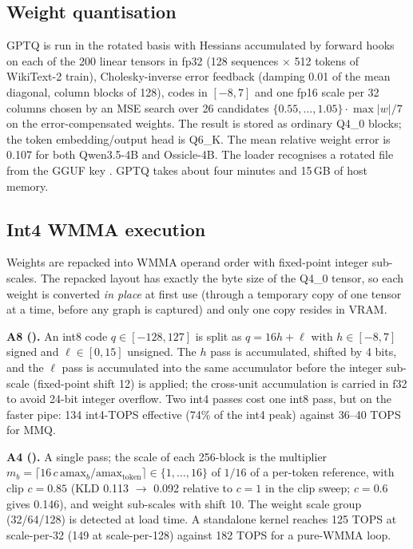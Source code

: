 \documentclass[10.5pt,a4paper]{article}
\newcommand{\tx}[1]{\texttt{\detokenize{#1}}}
\begin{document}
\subsection{Weight quantisation}
GPTQ is run in the rotated basis with Hessians accumulated by forward hooks on each of the 200 linear tensors in fp32 (128 sequences $\times$ 512 tokens of WikiText-2 train), Cholesky-inverse
error feedback (damping 0.01 of the mean diagonal, column blocks of 128), codes in $[-8,7]$ and one fp16 scale per 32 columns chosen by an MSE search over 26 candidates
$\{0.55,\ldots,1.05\}\cdot\max|w|/7$ on the error-compensated weights. The result is stored as ordinary Q4\_0 blocks; the token embedding/output head is Q6\_K. The mean relative weight error is
0.107 for both Qwen3.5-4B and Ossicle-4B. The loader recognises a rotated file from the GGUF key \tx{ossicle.int4_rotation_block}. GPTQ takes about four minutes and 15\,GB of host memory.

\subsection{Int4 WMMA execution}
Weights are repacked into WMMA operand order with fixed-point integer sub-scales. The repacked layout has exactly the byte size of the Q4\_0 tensor, so each weight is converted \emph{in place}
at first use (through a temporary copy of one tensor at a time, before any graph is captured) and only one copy resides in VRAM.

\textbf{A8 (\tx{quality}).} An int8 code $q\in[-128,127]$ is split as $q=16h+\ell$ with $h\in[-8,7]$ signed and $\ell\in[0,15]$ unsigned. The $h$ pass is accumulated, shifted by 4 bits, and the
$\ell$ pass is accumulated into the same accumulator before the integer sub-scale (fixed-point shift 12) is applied; the cross-unit accumulation is carried in f32 to avoid 24-bit integer overflow.
Two int4 passes cost one int8 pass, but on the faster pipe: 134 int4-TOPS effective (74\% of the int4 peak) against 36--40 TOPS for MMQ.

\textbf{A4 (\tx{fast}).} A single pass; the scale of each 256-block is the multiplier $m_b=\lceil16\,c\,\mathrm{amax}_b/\mathrm{amax}_{\text{token}}\rceil\in\{1,\ldots,16\}$ of $1/16$ of a per-token
reference, with clip $c=0.85$ (KLD 0.113 $\to$ 0.092 relative to $c=1$ in the clip sweep; $c=0.6$ gives 0.146), and weight sub-scales with shift 10. The weight scale group (32/64/128) is detected at load time.
A standalone kernel reaches 125 TOPS at scale-per-32 (149 at scale-per-128) against 182 TOPS for a pure-WMMA loop.
\end{document}
